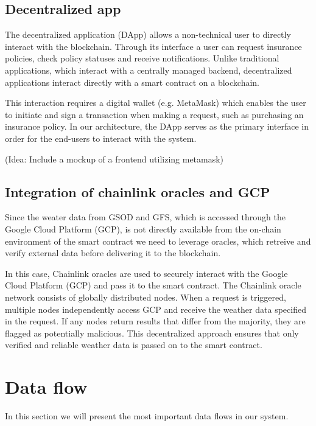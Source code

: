 \subsection{Decentralized app}\label{subsection:decentralizedApp}

The decentralized application (DApp) allows a non-technical user to directly interact with the blockchain. Through its interface a user can request insurance policies, check policy statuses and receive notifications. Unlike traditional applications, which interact with a centrally managed backend, decentralized applications interact directly with a smart contract on a blockchain.

This interaction requires a digital wallet (e.g. MetaMask) which enables the user to initiate and sign a transaction when making a request, such as purchasing an insurance policy. In our architecture, the DApp serves as the primary interface in order for the end-users to interact with the system. 

(Idea: Include a mockup of a frontend utilizing metamask)

\subsection{Integration of chainlink oracles and GCP}\label{subsection:ChainlinkOracle}

Since the weater data from GSOD and GFS, which is accessed through the Google Cloud Platform (GCP), is not directly available from the on-chain environment of the smart contract we need to leverage oracles, which retreive and verify external data before delivering it to the blockchain.

In this case, Chainlink oracles are used to securely interact with the Google Cloud Platform (GCP) and pass it to the smart contract. The Chainlink oracle network consists of globally distributed nodes. When a request is triggered, multiple nodes independently access GCP and receive the weather data specified in the request. If any nodes return results that differ from the majority, they are flagged as potentially malicious. This decentralized approach ensures that only verified and reliable weather data is passed on to the smart contract.


\section{Data flow}

In this section we will present the most important data flows in our system.

